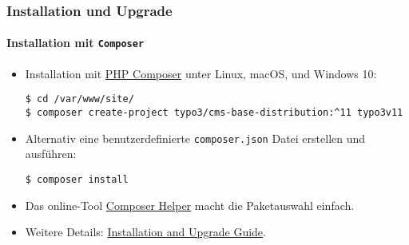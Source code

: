 %

\begin{frame}[fragile]
	\frametitle{Installation und Upgrade}
	\framesubtitle{Installation mit \texttt{Composer}}


	\begin{itemize}
		\item Installation mit \href{https://getcomposer.org}{PHP Composer} unter Linux, macOS, und Windows 10:
\begin{lstlisting}
$ cd /var/www/site/
$ composer create-project typo3/cms-base-distribution:^11 typo3v11
\end{lstlisting}

		\item Alternativ eine benutzerdefinierte \texttt{composer.json} Datei erstellen und ausführen:
\begin{lstlisting}
$ composer install
\end{lstlisting}

		\item Das online-Tool \href{https://get.typo3.org/misc/composer/helper}{Composer Helper}
			macht die Paketauswahl einfach.

		\item Weitere Details:  
			\href{https://docs.typo3.org/m/typo3/guide-installation/master/en-us/}{Installation and Upgrade Guide}.

	\end{itemize}
\end{frame}

